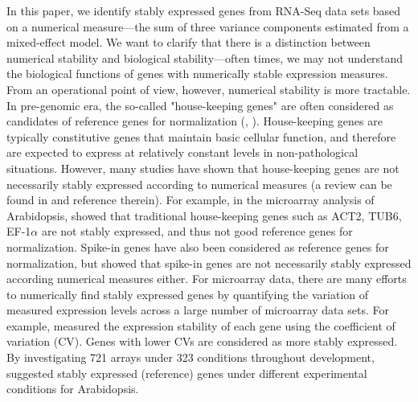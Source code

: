 \documentclass[11pt, a4paper]{article}
\begin{document}
In this paper, we identify stably expressed genes from RNA-Seq data sets based
on a numerical measure---the sum of three variance components estimated from a
mixed-effect model.  We want to clarify that there is a distinction between
numerical stability and biological stability---often times, we may not
understand the biological functions of genes with numerically stable
expression measures.  From an operational point of view, however, numerical
stability is more tractable. In pre-genomic era, the so-called "house-keeping
genes" are often considered as candidates of reference genes for
normalization (\cite{bustin2002quantification},
\cite{andersen2004normalization}). House-keeping
genes are typically constitutive genes that
maintain basic cellular function, and therefore are expected to express at
relatively constant levels in non-pathological situations.  However, many
studies have shown that house-keeping
genes are not necessarily stably expressed according to
numerical measures (a review can be found in \cite{huggett2005real} and
reference therein).  For example, in the microarray analysis of Arabidopsis, \cite{czechowski2005genome}
showed that traditional house-keeping
genes such as ACT2, TUB6, EF-1$\alpha$ are not stably
expressed, and thus not good reference genes for normalization.  Spike-in
genes have also been considered as reference genes for normalization, but
\cite{risso2014nat} showed that spike-in genes are not necessarily stably
expressed according numerical measures either.  
For microarray data, there are many efforts to numerically find stably
expressed genes by quantifying the variation of measured expression levels
across a large number of microarray data sets.  For example,
\cite{czechowski2005genome} measured the expression stability of each gene
using the coefficient of variation (CV). Genes with lower CVs are considered
as more stably expressed.  By investigating 721 arrays under 323 conditions
throughout development, \cite{czechowski2005genome} suggested stably expressed
(reference) genes under different experimental conditions for Arabidopsis.
\end{document}

